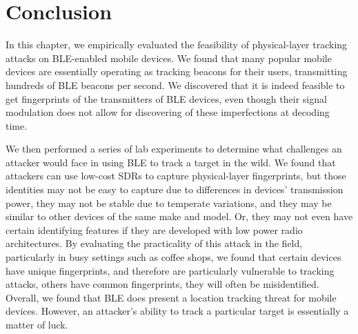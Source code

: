 \section{Conclusion}
\label{sec:conclusion}

In this chapter, we empirically evaluated the feasibility of physical-layer tracking attacks
on BLE-enabled mobile devices. 
%
We found that many popular mobile devices are
essentially operating as tracking beacons for their users, transmitting
hundreds of BLE beacons per second. We discovered that it is indeed feasible to
get fingerprints of the transmitters of BLE devices, even though their signal
modulation does not allow for discovering of these imperfections at decoding
time. 

We then performed a series of lab experiments  to determine what challenges an attacker would face in
using BLE to track a target in the wild. 
%
We found that attackers can use
low-cost SDRs to capture physical-layer fingerprints, but those identities may
not be easy to capture due to differences in devices' transmission power, they
may not be stable due to temperate variations, and they may be similar to other
devices of the same make and model. 
%
Or, they may not even have certain
identifying features if they are developed with low power radio architectures.
By evaluating the practicality of this attack in the field, particularly in
busy settings such as coffee shops, we found that certain devices have unique
fingerprints, and therefore are particularly vulnerable to tracking attacks,
others have common fingerprints, they will often be misidentified. 
%
Overall, we
found that BLE does present a location tracking threat for mobile devices.
However, an attacker's ability to track a particular target is essentially a
matter of luck.

